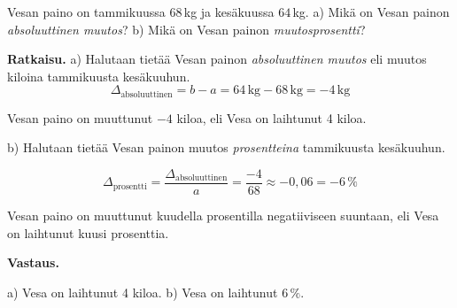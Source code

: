 \begin{esimerkki}
    Vesan paino on tammikuussa $68$\,kg ja kesäkuussa $64$\,kg.
    \newline a) Mikä on Vesan painon \textit{absoluuttinen muutos}?
    \newline b) Mikä on Vesan painon \textit{muutosprosentti}?
    
    \textbf{Ratkaisu.}
a) Halutaan tietää Vesan painon \textit{absoluuttinen muutos} eli muutos kiloina tammikuusta kesäkuuhun.
    \[
       \Delta_{\text{absoluuttinen}} = b - a = 64\,\text{kg} - 68\,\text{kg} = -4\,\text{kg}
    \]

    Vesan paino on muuttunut $-4$ kiloa, eli Vesa on laihtunut 4 kiloa.

b) Halutaan tietää Vesan painon muutos \textit{prosentteina} tammikuusta kesäkuuhun.
    
    \[
        \Delta_{\text{prosentti}}
        = \frac{\Delta_{\text{absoluuttinen}}}{a}
        = \frac{-4}{68}
        \approx -0,06
        = -6\,\% 
    \]
    
    Vesan paino on muuttunut kuudella prosentilla negatiiviseen suuntaan,
    eli Vesa on laihtunut kuusi prosenttia.
    
    \textbf{Vastaus.}
    
a) Vesa on laihtunut 4 kiloa.
b) Vesa on laihtunut $6\,\%$.
\end{esimerkki}

    
